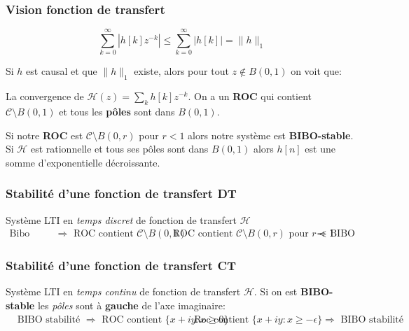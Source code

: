 \documentclass{report}
\begin{document}
\subsubsection{Vision fonction de transfert}
\begin{figure}
\centering
\begin{equation}
\sum_{k=0}^{\infty} |h[k] z^{-k}| \leqslant \sum_{k=0}^{\infty} |h[k]| = \parallel h \parallel_1
\end{equation}
\end{figure}
Si $h$ est causal et que $\parallel h \parallel_1$ existe, alors pour tout $z \notin B(0,1)$ on voit que:\par 
La convergence de $\mathcal{H}(z) = \sum_k h[k] z^{-k}$. On a un \textbf{ROC} qui contient $\mathcal{C}\setminus B(0,1)$ et tous les \textbf{pôles} sont dans $B(0,1)$.\par 
Si notre \textbf{ROC} est $\mathcal{C}\setminus B(0,r)$ pour $r< 1$ alors notre système est \textbf{BIBO-stable}. Si $\mathcal{H}$ est rationnelle et tous ses pôles sont dans $B(0,1)$ alors $h[n]$ est une somme d'exponentielle décroissante.

\subsubsection{Stabilité d'une fonction de transfert DT}
Système LTI en \textit{temps discret} de fonction de transfert $\mathcal{H}$
\begin{align}
\text{Bibo stabilité } &\Rightarrow \text{ ROC contient } \mathcal{C}\setminus B(0,1) &  \text{ ROC contient } \mathcal{C}\setminus B(0,r) \text{ pour } r<1 & \Rightarrow \text{ BIBO stabilité}
\end{align}

\subsubsection{Stabilité d'une fonction de transfert CT}
Système LTI en \textit{temps continu} de fonction de transfert $\mathcal{H}$. Si on est \textbf{BIBO-stable} les \textit{pôles} sont à \textbf{gauche} de l'axe imaginaire:
\begin{align}
&\text{BIBO stabilité } \Rightarrow \text{ ROC contient } \{x+iy: x \geqslant 0\} & &\text{ Roc contient } \{x + iy : x \geqslant - \epsilon\} \Rightarrow \text{ BIBO stabilité}
\end{align}
\end{document}
